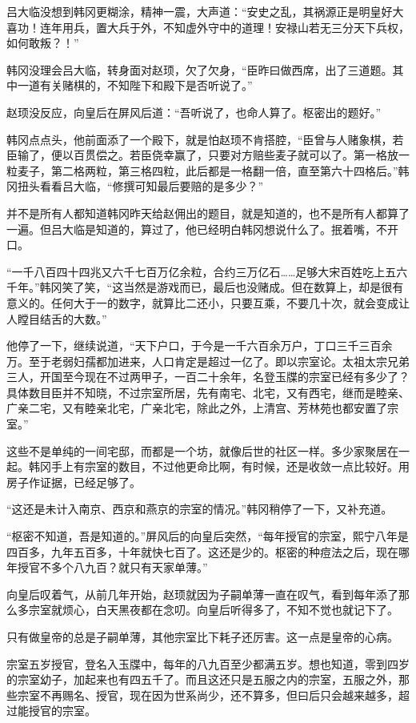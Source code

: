 吕大临没想到韩冈更糊涂，精神一震，大声道：“安史之乱，其祸源正是明皇好大喜功！连年用兵，置大兵于外，不知虚外守中的道理！安禄山若无三分天下兵权，如何敢叛？！”

韩冈没理会吕大临，转身面对赵顼，欠了欠身，“臣昨曰做西席，出了三道题。其中一道有关赌棋的，不知陛下和殿下是否听说了。”

赵顼没反应，向皇后在屏风后道：“吾听说了，也命人算了。枢密出的题好。”

韩冈点点头，他前面添了一个殿下，就是怕赵顼不肯搭腔，“臣曾与人赌象棋，若臣输了，便以百贯偿之。若臣侥幸赢了，只要对方赔些麦子就可以了。第一格放一粒麦子，第二格两粒，第三格四粒，此后都是一格翻一倍，直至第六十四格后。”韩冈扭头看看吕大临，“修撰可知最后要赔的是多少？”

并不是所有人都知道韩冈昨天给赵佣出的题目，就是知道的，也不是所有人都算了一遍。但吕大临是知道的，算过了，他已经明白韩冈想说什么了。抿着嘴，不开口。

“一千八百四十四兆又六千七百万亿余粒，合约三万亿石……足够大宋百姓吃上五六千年。”韩冈笑了笑，“这当然是游戏而已，最后也没赌成。但在数算上，却是很有意义的。任何大于一的数字，就算比二还小，只要互乘，不要几十次，就会变成让人瞠目结舌的大数。”

他停了一下，继续说道，“天下户口，于今是一千六百余万户，丁口三千三百余万。至于老弱妇孺都加进来，人口肯定是超过一亿了。即以宗室论。太祖太宗兄弟三人，开国至今现在不过两甲子，一百二十余年，名登玉牒的宗室已经有多少了？具体数目臣并不知晓，不过宗室所居，先有南宅、北宅，又有西宅，继而是睦亲、广亲二宅，又有睦亲北宅，广亲北宅，除此之外，上清宫、芳林苑也都安置了宗室。”

这些不是单纯的一间宅邸，而都是一个坊，就像后世的社区一样。多少家聚居在一起。韩冈手上有宗室的数目，不过他更命比啊，有时候，还是收敛一点比较好。用房子作证据，已经足够了。

“这还是未计入南京、西京和燕京的宗室的情况。”韩冈稍停了一下，又补充道。

“枢密不知道，吾是知道的。”屏风后的向皇后突然，“每年授官的宗室，熙宁八年是四百多，九年五百多，十年就快七百了。这还是少的。枢密的种痘法之后，现在哪年授官不多个八九百？就只有天家单薄。”

向皇后叹着气，从前几年开始，赵顼就因为子嗣单薄一直在叹气，看到每年添了那么多宗室就烦心，白天黑夜都在念叨。向皇后听得多了，不知不觉也就记下了。

只有做皇帝的总是子嗣单薄，其他宗室比下耗子还厉害。这一点是皇帝的心病。

宗室五岁授官，登名入玉牒中，每年的八九百至少都满五岁。想也知道，零到四岁的宗室幼子，加起来也有四五千了。而且这还只是五服之内的宗室，五服之外，那些宗室不再赐名、授官，现在因为世系尚少，还不算多，但曰后只会越来越多，超过能授官的宗室。

